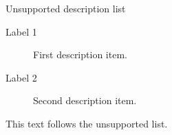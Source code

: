 \documentclass[14pt,t]{beamer}
\begin{document}
\begin{frame}{Unsupported description list}
\begin{description}
  \item[Label 1] First description item.
  \item[Label 2] Second description item.
\end{description}
This text follows the unsupported list.
\end{frame}
\end{document}
